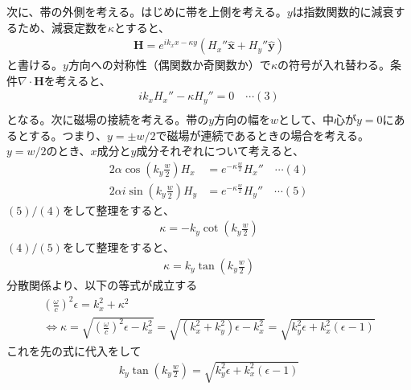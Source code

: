 \documentclass[a4paper,11pt,dvipdfmx]{jsarticle}
\begin{document}
\begin{enumerate}
        次に、帯の外側を考える。はじめに帯を上側を考える。$y$は指数関数的に減衰するため、減衰定数を$\kappa$とすると、
        \begin{align*}
          \mathbf{H} = e^{i k_x x - \kappa y}\left( H_x'' \hat{\boldsymbol{x}} + H_y'' \hat{\boldsymbol{y}} \right)
        \end{align*}
        と書ける。$y$方向への対称性（偶関数か奇関数か）で$\kappa$の符号が入れ替わる。条件$\nabla \cdot \mathbf{H}$を考えると、
        \begin{align*}
          i k_x H_x'' - \kappa H_y'' = 0 \quad \cdots (3) \\
        \end{align*}
        となる。次に磁場の接続を考える。帯の$y$方向の幅を$w$として、中心が$y = 0$にあるとする。つまり、$y = \pm w / 2$で磁場が連続であるときの場合を考える。
        $y = w / 2$のとき、$x成分とy$成分それぞれについて考えると、
        \begin{align*}
          2 \alpha \cos \left( k_y \frac{w}{2} \right)H_x &= e^{- \kappa \frac{w}{2}} H_x'' \quad \cdots (4) \\
          2 \alpha i \sin \left( k_y \frac{w}{2} \right)H_y &= e^{- \kappa \frac{w}{2}} H_y'' \quad \cdots (5)
        \end{align*}
        $(5)/(4)$をして整理をすると、
        \begin{align*}
          \kappa = - k_y \cot \left( k_y \frac{w}{2} \right)
        \end{align*}
        $(4)/(5)$をして整理をすると、
        \begin{align*}
          \kappa = k_y \tan \left( k_y \frac{w}{2} \right)
        \end{align*}
        分散関係より、以下の等式が成立する
        \begin{gather*}
          \left( \frac{\omega}{c} \right)^2 \epsilon = k_x^2 + \kappa^2
          \\
          \Longleftrightarrow  \kappa = \sqrt{\left( \frac{\omega}{c} \right)^2 \epsilon - k_x^2} = \sqrt{\left( k_x^2 + k_y^2 \right) \epsilon - k_x^2} = \sqrt{k_y^2 \epsilon + k_x^2 \left( \epsilon - 1 \right)}
        \end{gather*}
        これを先の式に代入をして
        \begin{align*}
          k_y \tan \left( k_y \frac{w}{2} \right) = \sqrt{k_y^2 \epsilon + k_x^2 \left( \epsilon - 1 \right)}
        \end{align*}
    \end{enumerate}
    
\end{document}
